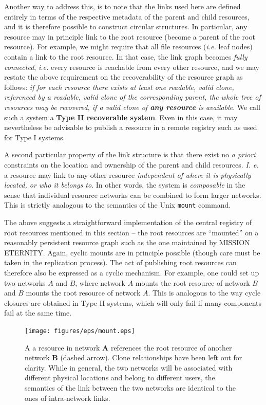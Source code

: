 \documentclass[11pt]{article}
\begin{document}
\begin{mainmatter}
Another way to address this, is to note that the links used here are defined entirely in terms of the respective metadata of the parent and child resources, and it is therefore possible to construct circular structures. In particular, any resource may in principle link to the root resource (become a parent of the root resource). For example, we might require that all file resources (\emph{i.e.} leaf nodes) contain a link to the root resource. In that case, the link graph becomes \emph{fully connected}, \emph{i.e.} every resource is reachable from every other resource, and we may restate the above requirement on the recoverability of the resource graph as follows: \emph{if for each resource there exists at least one readable, valid clone, referenced by a readable, valid clone of the corresponding parent, the whole tree of resources may be recovered, if a valid clone of \textbf{any resource} is available}. We call such a system a\label{typeTwo} \textbf{Type II recoverable system}. Even in this case, it may nevertheless be advisable to publish a resource in a remote registry such as used for Type I systems.

A second particular property of the link structure is that there exist no \emph{a priori} constraints on the location and ownership of the parent and child resources. \emph{I. e.} a resource may link to any other resource \emph{independent of where it is physically located, or who it belongs to}. In other words, the system is \emph{composable} in the sense that individual resource networks can be combined to form larger networks. This is strictly analogous to the semantics of the Unix \texttt{mount} command. 

The above suggests a straightforward implementation of the central registry of root resources mentioned in this section -- the root resources are ``mounted'' on a reasonably persistent resource graph such as the one maintained by MISSION ETERNITY. Again, cyclic mounts are in principle possible (though care must be taken in the replication process). The act of publishing root resources can therefore also be expressed as a cyclic mechanism. For example, one could set up two networks $A$ and $B$, where network $A$ mounts the root resource of network $B$ and $B$ mounts the root resource of network $A$. This is analogous to the way cycle closures are obtained in Type II systems, which will only fail if many components fail at the same time.


\begin{figure}[ht!]
\texttt{[image: figures/eps/mount.eps]}
\caption{
A a resource in network \textbf{A} references the root resource of another network \textbf{B} (dashed arrow). Clone relationships have been left out for clarity. While in general, the two networks will be associated with different physical locations and belong to different users, the semantics of the link between the two networks are identical to the ones of intra-network links. 
}
\end{figure}


\end{mainmatter}
\end{document}
